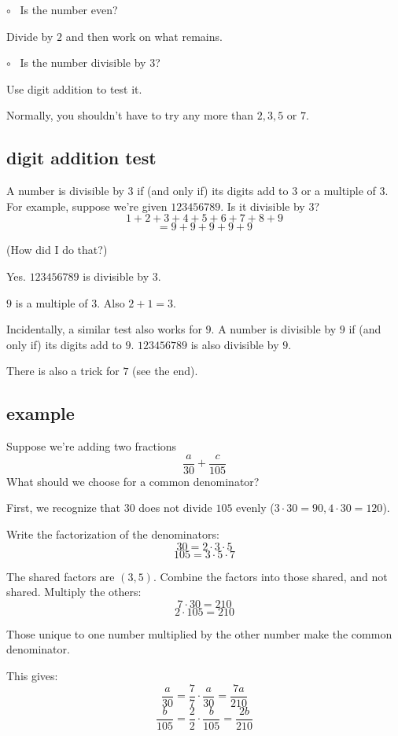 \documentclass[11pt, oneside]{article}
\begin{document}
$\circ$ \ Is the number even?  

Divide by $2$ and then work on what remains.

$\circ$ \ Is the number divisible by $3$?

Use digit addition to test it.  

Normally, you shouldn't have to try any more than $2,3,5$ or $7$.

\subsection*{digit addition test}

A number is divisible by $3$ if (and only if) its digits add to $3$ or a multiple of $3$.  For example, suppose we're given $123456789$.  Is it divisible by $3$?
\[ 1 + 2 + 3 + 4 + 5 + 6 + 7 + 8 + 9 \]
\[ = 9 + 9 + 9 + 9 + 9  \]

(How did I do that?)

Yes.  $123456789$ is divisible by $3$.

$9$ is a multiple of $3$.  Also $2 + 1 = 3$.

Incidentally, a similar test also works for $9$.  A number is divisible by $9$ if (and only if) its digits add to $9$.  $123456789$ is also divisible by $9$.

There is also a trick for $7$ (see the end).

\subsection*{example}

Suppose we're adding two fractions
\[ \frac{a}{30} + \frac{c}{105}  \]
What should we choose for a common denominator?  

First, we recognize that $30$ does not divide $105$ evenly ($3 \cdot 30 = 90, 4 \cdot 30 = 120$).

Write the factorization of the denominators:
\[ 30 = 2 \cdot 3 \cdot 5 \]
\[ 105 = 3 \cdot 5 \cdot 7 \]

The shared factors are $(3,5)$.  Combine the factors into those shared, and not shared.  Multiply the others:
\[ 7 \cdot 30 = 210 \]
\[ 2 \cdot 105 = 210 \]

Those unique to one number multiplied by the other number make the common denominator.

This gives:
\[ \frac{a}{30} = \frac{7}{7} \cdot \frac{a}{30} = \frac{7a}{210} \]
\[ \frac{b}{105} = \frac{2}{2} \cdot \frac{b}{105} = \frac{2b}{210} \]
\end{document}
